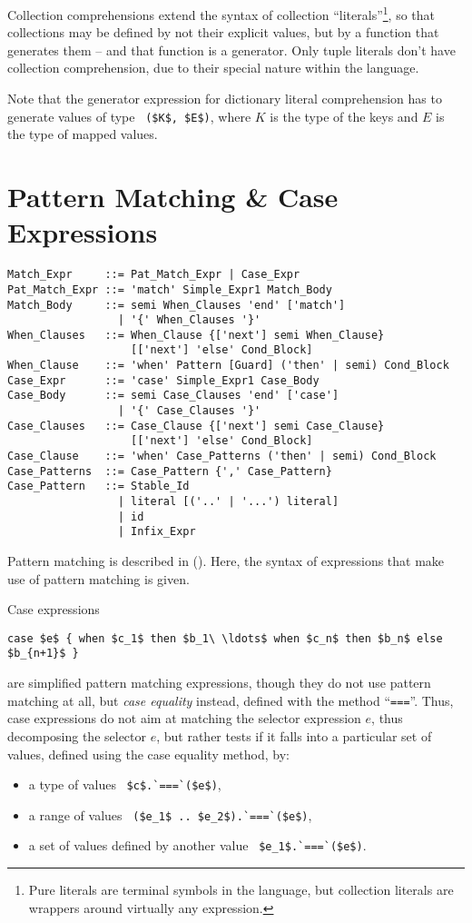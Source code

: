 Collection comprehensions extend the syntax of collection ``literals''\footnote{Pure literals are terminal symbols in the language, but collection literals are wrappers around virtually any expression.}, so that collections may be defined by not their explicit values, but by a function that generates them -- and that function is a generator. Only tuple literals don't have collection comprehension, due to their special nature within the language. 

Note that the generator expression for dictionary literal comprehension has to generate values of type ~\lstinline!($K$, $E$)!, where $K$ is the type of the keys and $E$ is the type of mapped values. 






\section{Pattern Matching \& Case Expressions}

\syntax\begin{lstlisting}
Match_Expr     ::= Pat_Match_Expr | Case_Expr
Pat_Match_Expr ::= 'match' Simple_Expr1 Match_Body
Match_Body     ::= semi When_Clauses 'end' ['match']
                 | '{' When_Clauses '}'
When_Clauses   ::= When_Clause {['next'] semi When_Clause} 
                   [['next'] 'else' Cond_Block]
When_Clause    ::= 'when' Pattern [Guard] ('then' | semi) Cond_Block
Case_Expr      ::= 'case' Simple_Expr1 Case_Body
Case_Body      ::= semi Case_Clauses 'end' ['case']
                 | '{' Case_Clauses '}'
Case_Clauses   ::= Case_Clause {['next'] semi Case_Clause}
                   [['next'] 'else' Cond_Block]
Case_Clause    ::= 'when' Case_Patterns ('then' | semi) Cond_Block
Case_Patterns  ::= Case_Pattern {',' Case_Pattern}
Case_Pattern   ::= Stable_Id
                 | literal [('..' | '...') literal]
                 | id
                 | Infix_Expr
\end{lstlisting}

Pattern matching is described in (). Here, the syntax of expressions that make use of pattern matching is given. 

Case expressions 
\begin{lstlisting}
case $e$ { when $c_1$ then $b_1\ \ldots$ when $c_n$ then $b_n$ else $b_{n+1}$ }
\end{lstlisting}
are simplified pattern matching expressions, though they do not use pattern matching at all, but {\em case equality} instead, defined with the method ``\lstinline!===!''. Thus, case expressions do not aim at matching the selector expression $e$, thus decomposing the selector $e$, but rather tests if it falls into a particular set of values, defined using the case equality method, by:
\begin{itemize}
\item a type of values ~\lstinline!$c$.`===`($e$)!,
\item a range of values ~\lstinline!($e_1$ .. $e_2$).`===`($e$)!, 
\item a set of values defined by another value ~\lstinline!$e_1$.`===`($e$)!.
\end{itemize}

